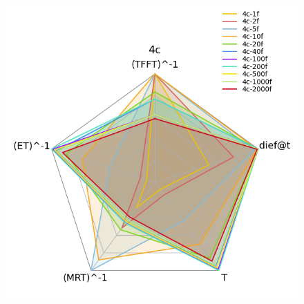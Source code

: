 \documentclass[12pt,a4paper]{article}
\begin{document}
\begin{figure}[H]
{\begin{minipage}{0.5\textwidth}
            \includegraphics[scale=0.6]{../processed/NRT/small/checks/60-0.02/fixedcores/4c/plots/radar-dieft.png}
            \caption*{}
        \end{minipage}
    }
    
    \vspace{0.5cm} %


\end{figure}
\end{document}
